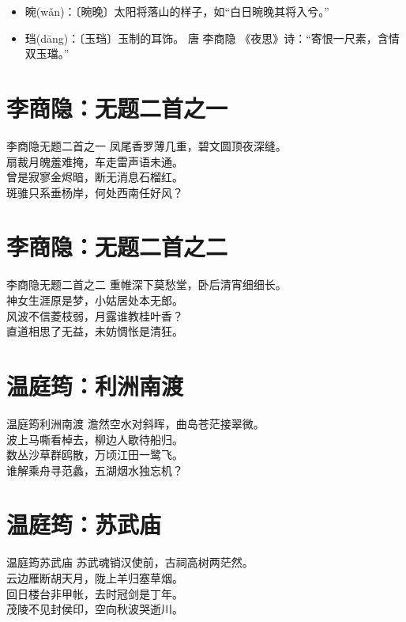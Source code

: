 \documentclass[12pt,oneside,a5paper]{book}
\begin{document}
\begin{itemize}
\item 晼(wǎn)：〔晼晚〕太阳将落山的样子，如“白日晼晚其将入兮。”
\item 珰(dāng)：〔玉珰〕玉制的耳饰。 唐 李商隐 《夜思》诗：“寄恨一尺素，含情双玉璫。”
\end{itemize}

\chapter{李商隐：无题二首之一}
\begin{poemzh}{李商隐}{无题二首之一}
凤尾香罗薄几重，碧文圆顶夜深缝。\\
扇裁月魄羞难掩，车走雷声语未通。\\
曾是寂寥金烬暗，断无消息石榴红。\\
斑骓只系垂杨岸，何处西南任好风？\\ 
\end{poemzh}

\chapter{李商隐：无题二首之二}
\begin{poemzh}{李商隐}{无题二首之二}
重帷深下莫愁堂，卧后清宵细细长。\\
神女生涯原是梦，小姑居处本无郎。\\
风波不信菱枝弱，月露谁教桂叶香？\\
直道相思了无益，未妨惆怅是清狂。\\ 
\end{poemzh}

\chapter{温庭筠：利洲南渡}
\begin{poemzh}{温庭筠}{利洲南渡}
澹然空水对斜晖，曲岛苍茫接翠微。\\
波上马嘶看棹去，柳边人歇待船归。\\
数丛沙草群鸥散，万顷江田一鹭飞。\\
谁解乘舟寻范蠡，五湖烟水独忘机？\\ 
\end{poemzh}

\chapter{温庭筠：苏武庙}
\begin{poemzh}{温庭筠}{苏武庙}
苏武魂销汉使前，古祠高树两茫然。\\
云边雁断胡天月，陇上羊归塞草烟。\\
回日楼台非甲帐，去时冠剑是丁年。\\
茂陵不见封侯印，空向秋波哭逝川。\\ 
\end{poemzh}
\end{document}
